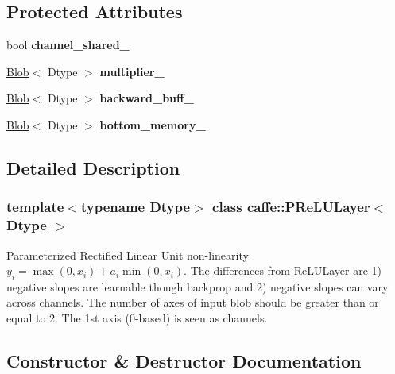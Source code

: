 \subsection*{Protected Attributes}
\begin{DoxyCompactItemize}
\item 
\mbox{\label{classcaffe_1_1_p_re_l_u_layer_a300a9efaa34b12279331619be8c3e290}} 
bool {\bfseries channel\+\_\+shared\+\_\+}
\item 
\mbox{\label{classcaffe_1_1_p_re_l_u_layer_a4ac682720a6a5e5f32e8c71c3f152100}} 
\mbox{\hyperlink{classcaffe_1_1_blob}{Blob}}$<$ Dtype $>$ {\bfseries multiplier\+\_\+}
\item 
\mbox{\label{classcaffe_1_1_p_re_l_u_layer_a8a32ea8e8f56d5ffe128e1ef2e9f497d}} 
\mbox{\hyperlink{classcaffe_1_1_blob}{Blob}}$<$ Dtype $>$ {\bfseries backward\+\_\+buff\+\_\+}
\item 
\mbox{\label{classcaffe_1_1_p_re_l_u_layer_a59b4c1b81e695ec3f6f9cf70cec03c46}} 
\mbox{\hyperlink{classcaffe_1_1_blob}{Blob}}$<$ Dtype $>$ {\bfseries bottom\+\_\+memory\+\_\+}
\end{DoxyCompactItemize}


\subsection{Detailed Description}
\subsubsection*{template$<$typename Dtype$>$\newline
class caffe\+::\+P\+Re\+L\+U\+Layer$<$ Dtype $>$}

Parameterized Rectified Linear Unit non-\/linearity $ y_i = \max(0, x_i) + a_i \min(0, x_i) $. The differences from \mbox{\hyperlink{classcaffe_1_1_re_l_u_layer}{Re\+L\+U\+Layer}} are 1) negative slopes are learnable though backprop and 2) negative slopes can vary across channels. The number of axes of input blob should be greater than or equal to 2. The 1st axis (0-\/based) is seen as channels. 

\subsection{Constructor \& Destructor Documentation}
\mbox{\label{classcaffe_1_1_p_re_l_u_layer_a9d164a537a2f77b4143d2491f4809732}} 
